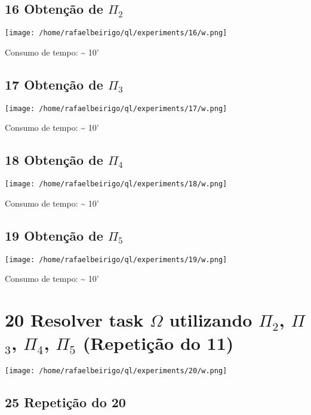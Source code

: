 \documentclass[11pt]{article}
\begin{document}
\subsection{16 Obtenção de $\Pi$$_2$}
\label{sec-5.2}

\centerline{\texttt{[image: /home/rafaelbeirigo/ql/experiments/16/w.png]}}

  Consumo de tempo: \~{} 10'


\subsection{17 Obtenção de $\Pi$$_3$}
\label{sec-5.3}

\centerline{\texttt{[image: /home/rafaelbeirigo/ql/experiments/17/w.png]}}

  Consumo de tempo: \~{} 10'


\subsection{18 Obtenção de $\Pi$$_4$}
\label{sec-5.4}

\centerline{\texttt{[image: /home/rafaelbeirigo/ql/experiments/18/w.png]}}

  Consumo de tempo: \~{} 10'


\subsection{19 Obtenção de $\Pi$$_5$}
\label{sec-5.5}

\centerline{\texttt{[image: /home/rafaelbeirigo/ql/experiments/19/w.png]}}

  Consumo de tempo: \~{} 10'


\section{20 Resolver task $\Omega$ utilizando $\Pi$$_2$, $\Pi$$_3$, $\Pi$$_4$, $\Pi$$_5$ (Repetição do 11)}
\label{sec-6}

\centerline{\texttt{[image: /home/rafaelbeirigo/ql/experiments/20/w.png]}}



\subsection{25 Repetição do 20}
\label{sec-6.1}
\end{document}

